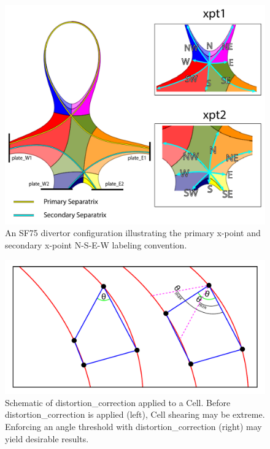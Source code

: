 \begin{figure}[H]
    \centering
    \includegraphics[width=\linewidth]{figures/xpt_2_directions.pdf}
    \caption{An SF75 divertor configuration illustrating the primary x-point and secondary x-point N-S-E-W labeling convention.}
    \label{fig:xpt_2_directions}
\end{figure}

\begin{figure}[H]
    \centering
    \includegraphics[width=\linewidth]{figures/cell_shearing_diagram.pdf}
    \caption{Schematic of distortion\_correction applied to a Cell. Before distortion\_correction is applied (left), Cell shearing may be extreme. Enforcing an angle threshold with distortion\_correction (right) may yield desirable results.}
    \label{fig:cell_shearing}
\end{figure}

